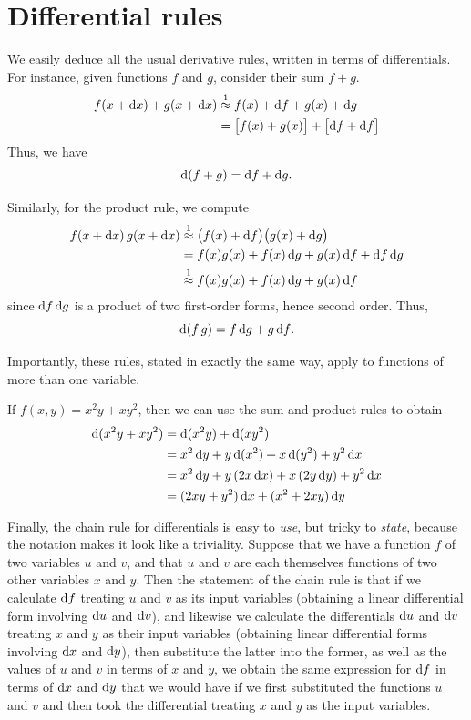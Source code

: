 \section{Differential rules}
\label{sec:differential-rules}

We easily deduce all the usual derivative rules, written in terms of differentials.
For instance, given functions $f$ and $g$, consider their sum $f+g$.
\begin{align*}
  f(x+{\mathrm{d} x}) + g(x+{\mathrm{d} x})
  &\mathrel{\overset{1}{\approx}} f(x) + {\mathrm{d} f} + g(x) + {\mathrm{d} g}\\
  &= \big[f(x) + g(x)\big] + \big[ {\mathrm{d} f} + {\mathrm{d} f} \big]
\end{align*}
Thus, we have
\[ \mathrm{d}(f+g) = {\mathrm{d} f} + {\mathrm{d} g}. \]

Similarly, for the product rule, we compute
\begin{align*}
  f(x+{\mathrm{d} x}) \, g(x+{\mathrm{d} x})
  &\mathrel{\overset{1}{\approx}} \big(f(x)+{\mathrm{d} f}\big)\big(g(x) + {\mathrm{d} g} \big)\\
  &= f(x) g(x) + f(x) \,{\mathrm{d} g} + g(x) \,{\mathrm{d} f} + {\mathrm{d} f}\,{\mathrm{d} g}\\
  &\mathrel{\overset{1}{\approx}} f(x) g(x) + f(x) \,{\mathrm{d} g} + g(x) \,{\mathrm{d} f}
\end{align*}
since ${\mathrm{d} f}\,{\mathrm{d} g}$ is a product of two first-order forms, hence second order.
Thus,
\[ \mathrm{d}(f\,g) = f\,{\mathrm{d} g} + g\,{\mathrm{d} f}.\]

Importantly, these rules, stated in exactly the same way, apply to functions of more than one variable.
\begin{eg}\label{eg:twovar-differential}
  If $f(x,y) = x^2y + xy^2$, then we can use the sum and product rules to obtain
  \begin{align*}
    \mathrm{d}(x^2y + xy^2) &= \mathrm{d}(x^2y) + \mathrm{d}(xy^2)\\
    &= x^2\,{\mathrm{d} y} + y \,\mathrm{d}(x^2) + x \,\mathrm{d}(y^2) + y^2\,{\mathrm{d} x}\\
    &= x^2\,{\mathrm{d} y} + y \,(2x\,{\mathrm{d} x}) + x\, (2y\,{\mathrm{d} y}) + y^2\,{\mathrm{d} x}\\
    &= (2xy + y^2)\,{\mathrm{d} x} + (x^2+2xy)\,{\mathrm{d} y}
  \end{align*}
\end{eg}

Finally, the chain rule for differentials is easy to \emph{use}, but tricky to \emph{state}, because the notation makes it look like a triviality.
Suppose that we have a function $f$ of two variables $u$ and $v$, and that $u$ and $v$ are each themselves functions of two other variables $x$ and $y$.
Then the statement of the chain rule is that if we calculate ${\mathrm{d} f}$ treating $u$ and $v$ as its input variables (obtaining a linear differential form involving ${\mathrm{d} u}$ and ${\mathrm{d} v}$), and likewise we calculate the differentials ${\mathrm{d} u}$ and ${\mathrm{d} v}$ treating $x$ and $y$ as their input variables (obtaining linear differential forms involving ${\mathrm{d} x}$ and ${\mathrm{d} y}$), then substitute the latter into the former, as well as the values of $u$ and $v$ in terms of $x$ and $y$, we obtain the same expression for ${\mathrm{d} f}$ in terms of ${\mathrm{d} x}$ and ${\mathrm{d} y}$ that we would have if we first substituted the functions $u$ and $v$ and then took the differential treating $x$ and $y$ as the input variables.

